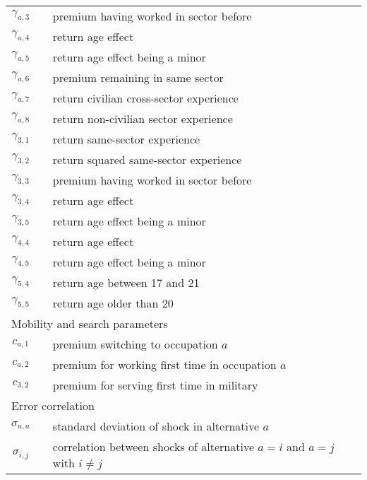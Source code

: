 \begin{ThreePartTable}
\begin{longtable}{@{}cll@{}}
$\gamma_{a,3}$       &  & premium having worked in sector before        							   \\
$\gamma_{a,4}$       &  & return age effect                             											     \\
$\gamma_{a,5}$       &  & return age effect being a minor               										\\
$\gamma_{a,6}$       &  & premium remaining in same sector              								   \\
$\gamma_{a,7}$       &  & return civilian cross-sector experience       								    \\
$\gamma_{a,8}$       &  & return non-civilian sector experience       										 \\
$\gamma_{3,1}$       &  & return same-sector experience                 									  \\
$\gamma_{3,2}$       &  & return squared same-sector experience    										 \\
$\gamma_{3,3}$       &  & premium having worked in sector before   										\\
$\gamma_{3,4}$       &  & return age effect                             												 \\
$\gamma_{3,5}$       &  & return age effect being a minor              	   										\\
$\gamma_{4,4}$       &  & return age effect                             												 \\
$\gamma_{4,5}$       &  & return age effect being a minor                  										\\
$\gamma_{5,4}$       &  & return age between 17 and 21                 	  									   \\
$\gamma_{5,5}$       &  & return age older than 20							   										\\[7.5pt] \midrule
\multicolumn{3}{l}{Mobility and search parameters}          													  \\ \midrule
$c_{a,1}$            &  & premium switching to occupation $a$           									   \\
$c_{a,2}$            &  & premium for working first time in occupation $a$         										  \\
$c_{3,2}$            &  & premium for serving first time in military    										  \\[7.5pt] \midrule
\multicolumn{3}{l}{Error correlation}          													  									\\ \midrule
$\sigma_{a,a}$	&	& standard deviation of shock in alternative $a$									\\
$\sigma_{i,j}$ &	& correlation between shocks of alternative $a = i$ and $a=j$ with $i \neq j$ \\

\end{longtable}
\end{ThreePartTable}
